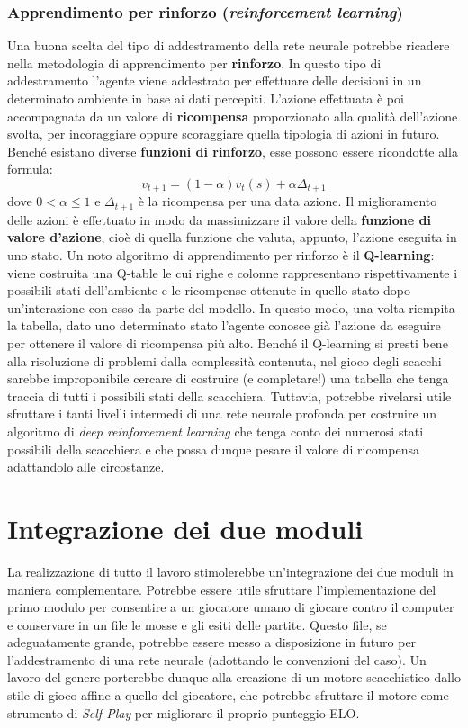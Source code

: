 \subsubsection{Apprendimento per rinforzo (\textit{reinforcement learning})}
Una buona scelta del tipo di addestramento della rete neurale potrebbe ricadere nella metodologia di apprendimento per \textbf{rinforzo}. In questo tipo di addestramento l'agente viene addestrato per effettuare delle decisioni in un determinato ambiente in base ai dati percepiti. L'azione effettuata è poi accompagnata da un valore di \textbf{ricompensa} proporzionato alla qualità dell'azione svolta, per incoraggiare oppure scoraggiare quella tipologia di azioni in futuro. Benché esistano diverse \textbf{funzioni di rinforzo}, esse possono essere ricondotte alla formula: 
\begin{equation}
    v_{t+1} = (1-\alpha)v_t(s) + \alpha\Delta_{t+1}
\end{equation}
dove $0<\alpha\leq1$ e $\Delta_{t+1}$ è la ricompensa per una data azione. Il miglioramento delle azioni è effettuato in modo da massimizzare il valore della \textbf{funzione di valore d'azione}, cioè di quella funzione che valuta, appunto, l'azione eseguita in uno stato.
Un noto algoritmo di apprendimento per rinforzo è il \textbf{Q-learning}: viene costruita una Q-table le cui righe e colonne rappresentano rispettivamente i possibili stati dell'ambiente e le ricompense ottenute in quello stato dopo un'interazione con esso da parte del modello. In questo modo, una volta riempita la tabella, dato uno determinato stato l'agente conosce già l'azione da eseguire per ottenere il valore di ricompensa più alto. Benché il Q-learning si presti bene alla risoluzione di problemi dalla complessità contenuta, nel gioco degli scacchi sarebbe improponibile cercare di costruire (e completare!) una tabella che tenga traccia di tutti i possibili stati della scacchiera. Tuttavia, potrebbe rivelarsi utile sfruttare i tanti livelli intermedi di una rete neurale profonda per costruire un algoritmo di \textit{deep reinforcement learning} che tenga conto dei numerosi stati possibili della scacchiera e che possa dunque pesare il valore di ricompensa adattandolo alle circostanze.


\section{Integrazione dei due moduli}
La realizzazione di tutto il lavoro stimolerebbe un'integrazione dei due moduli in maniera complementare. Potrebbe essere utile sfruttare l'implementazione del primo modulo per consentire a un giocatore umano di giocare contro il computer e conservare in un file le mosse e gli esiti delle partite. Questo file, se adeguatamente grande, potrebbe essere messo a disposizione in futuro per l'addestramento di una rete neurale (adottando le convenzioni del caso). Un lavoro del genere porterebbe dunque alla creazione di un motore scacchistico dallo stile di gioco affine a quello del giocatore, che potrebbe sfruttare il motore come strumento di \textit{Self-Play} per migliorare il proprio punteggio ELO. 
\newpage
